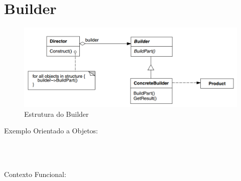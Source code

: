 \section{Builder}

\begin{figure}[htb]
	\caption{\label{fig_grafico}Estrutura do Builder}
	\begin{center}
	    \includegraphics[scale=0.5]{5_padroes-contexto-funcional/5.1_criacionais/5.1.3_builder/diagram.png}
	\end{center}
\end{figure}

Exemplo Orientado a Objetos:

\begin{lstlisting}[caption={Builder Orientado a Objetos},label=oobuilder]



\end{lstlisting}

Contexto Funcional:


\begin{lstlisting}[caption={Builder Funcional},label=fpbuilder]
    

    
\end{lstlisting}